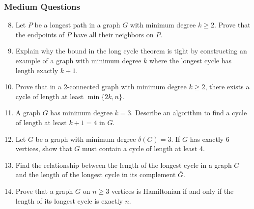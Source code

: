 \documentclass{article}
\theoremstyle{definition}
\begin{document}
\subsubsection{Medium Questions}
\begin{enumerate}\setcounter{enumi}{7}
\item Let $P$ be a longest path in a graph $G$ with minimum degree $k \geq 2$. Prove that the endpoints of $P$ have all their neighbors on $P$.

\item Explain why the bound in the long cycle theorem is tight by constructing an example of a graph with minimum degree $k$ where the longest cycle has length exactly $k+1$.

\item Prove that in a 2-connected graph with minimum degree $k \geq 2$, there exists a cycle of length at least $\min\{2k, n\}$.

\item A graph $G$ has minimum degree $k=3$. Describe an algorithm to find a cycle of length at least $k+1=4$ in $G$.

\item Let $G$ be a graph with minimum degree $\delta(G) = 3$. If $G$ has exactly 6 vertices, show that $G$ must contain a cycle of length at least 4.

\item Find the relationship between the length of the longest cycle in a graph $G$ and the length of the longest cycle in its complement $\overline{G}$.

\item Prove that a graph $G$ on $n \geq 3$ vertices is Hamiltonian if and only if the length of its longest cycle is exactly $n$.
\end{enumerate}
\end{document}

